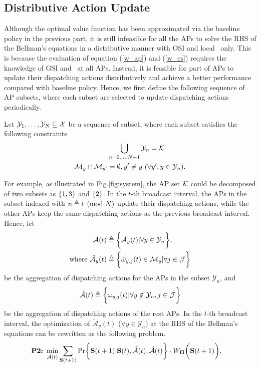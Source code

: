 \subsection{Distributive Action Update}
\label{subsec:ap_alg}
Although the optimal value function has been approximated via the baseline policy in the previous part, it is still infeasible for all the APs to solve the RHS of the Bellman's equations in a distributive manner with OSI and local \brlatency~only.
This is because the evaluation of equation (\ref{w_ap}) and (\ref{w_es}) requires the knowledge of GSI and \brlatency~at all APs.
Instead, it is feasible for part of APs to update their dispatching actions distributively and achieve a better performance compared with baseline policy.
Hence, we first define the following sequence of AP subsets, where each subset are selected to update dispatching actions periodically.
\begin{definition}
    Let $\mathcal{Y}_{1}, \dots, \mathcal{Y}_{N} \subseteq \mathcal{X}$ be a sequence of subset, where each subset satisfies the following constraints
    \begin{align}
        &\bigcup_{n=0,\dots,N-1} \mathcal{Y}_{n} = \mathcal{K}
        \\
        \mathcal{M}_{y} \cap \mathcal{M}_{y'} &=\emptyset, y' \neq y~(\forall y',y \in \mathcal{Y}_{n}).
    \end{align}
\end{definition}
For example, as illustrated in Fig.\ref{fig:system}, the AP set $\mathcal{K}$ could be decomposed of two subsets as $\{1,3\}$ and $\{2\}$.
In the $t$-th broadcast interval, the APs in the subset indexed with $n \triangleq t \pmod{N}$ update their dispatching actions, while the other APs keep the same dispatching actions as the previous broadcast interval.
Hence, let
\begin{align}
    \tilde{\mathcal{A}}(t) &\triangleq \bigg\{ \tilde{\mathcal{A}}_{y}(t) | \forall y\in\mathcal{Y}_{n} \bigg\},
    \nonumber\\
    \text{where } \tilde{\mathcal{A}}_{y}(t) &\triangleq \bigg\{\tilde{\omega}_{y,j}(t)\in \mathcal{M}_{y}|\forall j\in\mathcal{J}\bigg\}
\end{align}
be the aggregation of dispatching actions for the APs in the subset $\mathcal{Y}_{n}$, and
\begin{align}
    \hat{\mathcal{A}}(t) \triangleq \bigg\{\omega_{y,j}(t) | \forall y\notin\mathcal{Y}_{n}, j\in\mathcal{J}\bigg\}
\end{align}
be the aggregation of dispatching actions of the rest APs.
In the $t$-th broadcast interval, the optimization of $\tilde{\mathcal{A}}_{y}(t)$ ($\forall y\in\mathcal{Y}_{n}$) at the RHS of the Bellman's equations can be rewritten as the following problem.
{\small
\begin{align}
    \textbf{P2:}~
    \min_{ \tilde{\mathcal{A}}(t) }
    &\sum_{\Stat(t+1)} \Pr\Brace{
        \Stat(t+1) | \Stat(t), \tilde{\mathcal{A}}(t), \hat{\mathcal{A}}(t)
    } \cdot W_{\Baseline}\Paren{\Stat(t+1)},
\end{align}
}

